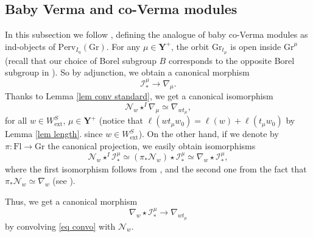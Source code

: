 \documentclass[11pt]{amsart}
\theoremstyle{plain}
\theoremstyle{remark}
\numberwithin{equation}{section}
\begin{document}
	\subsection{Baby Verma and co-Verma modules}\label{section Baby Verma and co-Verma modules} In this subsection we follow \cite[§5.6]{achar2022geometric}, defining the analogue of baby co-Verma modules as ind-objects of $\mathrm{Perv}_{I_\mathrm{u}}(\mathrm{Gr})$. For any $\mu\in\mathbf{Y}^+$, the orbit $\mathrm{Gr}_{t_{\mu}}$ is open inside $\mathrm{Gr}^\mu$ (recall that our choice of Borel subgroup $B$ corresponds to the opposite Borel subgroup in \cite{achar2022geometric}). So by adjunction, we obtain a canonical morphism 
 \begin{equation}\label{eq convo}
	    \mathcal{I}^\mu_*\to \nabla_{\mu}.
	\end{equation} Thanks to Lemma \ref{lem conv standard}, we get a canonical isomorphism 
 $$\mathcal{N}_w\star^I\nabla_{\mu}\simeq \nabla_{wt_{\mu}},$$
 for all $w\in W_{\mathrm{ext}}^S$, $\mu\in\mathbf{Y}^+$ (notice that $\ell(wt_{\mu}w_0)=\ell(w)+\ell(t_{\mu}w_0)$ by Lemma \ref{lem length}. since $w\in W_{\mathrm{ext}}^S$). On the other hand, if we denote by $\pi:\mathrm{Fl}\to\mathrm{Gr}$ the canonical projection, we easily obtain isomorphisms
 \begin{equation}\label{eq standard}
     \mathcal{N}_w\star^I \mathcal{I}^\mu_*\simeq(\pi_*\mathcal{N}_w)\star\mathcal{I}^\mu_*\simeq \nabla_{w}\star \mathcal{I}^\mu_*,
 \end{equation} 
 where the first isomorphism follows from \cite[Lemma 2.5]{JEP_2019__6__707_0}, and the second one from the fact that $\pi_*\mathcal{N}_w\simeq\nabla_w$ (see \cite[(3.4)]{achar2022geometric}). 

  Thus, we get a canonical morphism
	\begin{equation}\label{eq 513}
		\nabla_{w}\star \mathcal{I}^\mu_*\to \nabla_{wt_{\mu}}
	\end{equation}
by convolving \eqref{eq convo} with $\mathcal{N}_{w}$. 
	
\end{document}
